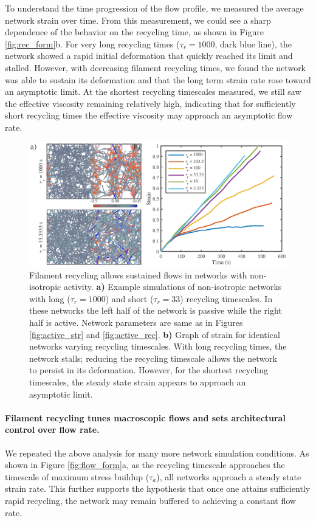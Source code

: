 \documentclass[10pt,letterpaper]{article}
\begin{document}
To understand the time progression of the flow profile, we measured the average network strain over time.  From this measurement, we could see a sharp dependence of the behavior on the recycling time, as shown in Figure \ref{fig:rec_form}b.  For very long recycling times ($\tau_r=1000$, dark blue line), the network showed a rapid initial deformation that quickly reached its limit and stalled.  However, with decreasing filament recycling times, we found the network was able to sustain its deformation and that the long term strain rate rose toward an asymptotic limit.  At the shortest recycling timescales measured, we still saw the effective viscosity remaining relatively high, indicating that for sufficiently short recycling times the effective viscosity may approach an asymptotic flow rate.

\begin{figure}[h!]
\centering
\includegraphics[width=\hsize]{figures/figure6a}
\caption{\label{fig:flow_ex}  Filament recycling allows sustained flows in networks with non-isotropic activity. \textbf{a)} Example simulations of non-isotropic networks with long ($\tau_r=1000$) and short ($\tau_r=33$) recycling timescales. In these networks the left half of the network is passive while the right half is active.  Network parameters are same as in Figures \ref{fig:active_str} and \ref{fig:active_rec}. \textbf{b)} Graph of strain for identical networks varying recycling timescales.  With long recycling times, the network stalls; reducing the recycling timescale allows the network to persist in its deformation.  However, for the shortest recycling timescales, the steady state strain appears to approach an asymptotic limit. }
\end{figure}

\paragraph{Filament recycling tunes macroscopic flows and sets architectural control over flow rate.}
We repeated the above analysis for many more network simulation conditions. As shown in Figure \ref{fig:flow_form}a, as the recycling timescale approaches the timescale of maximum stress buildup ($\tau_a$), all networks approach a steady state strain rate.  This further supports the hypothesis that once one attains sufficiently rapid recycling, the network may remain buffered to achieving a constant flow rate.
\end{document}
